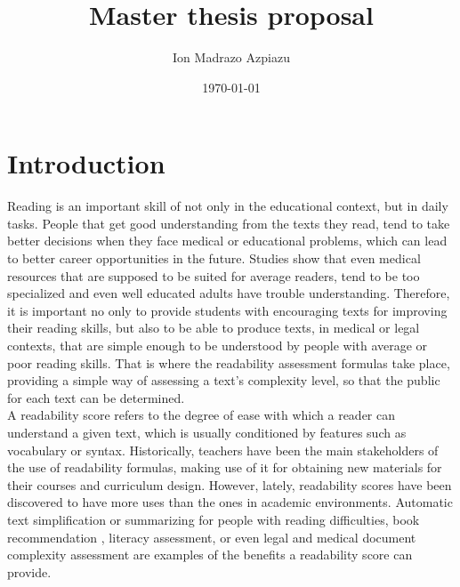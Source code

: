 \documentclass[12pt]{article}
\title{Master thesis proposal}
\author{Ion Madrazo Azpiazu}
\date{\today}
\begin{document}
\maketitle
\section{Introduction}

Reading is an important skill of not only in the educational context, but in daily tasks. People that get good understanding from the texts they read, tend to take better decisions when they face medical or educational problems, which can lead to better career opportunities in the future. Studies\cite{medicalReadability1}\cite{medicalReadability2}\cite{medicalReadability3} show that even medical resources that are supposed to be suited for average readers, tend to be too specialized and even well educated adults have trouble understanding. Therefore, it is important no only to provide students with encouraging texts for improving their reading skills, but also to be able to produce texts, in medical or legal contexts, that are simple enough to be understood by people with average or poor reading skills.  That is where the readability assessment formulas take place, providing a simple way of assessing a text's complexity level, so that the public for each text can be determined. \\


A readability score refers to the degree of ease with which a reader can understand a given text, which is usually conditioned by features such as vocabulary or syntax. Historically, teachers have been the main stakeholders of the use of readability formulas, making use of it for obtaining new materials for their courses and curriculum design. However, lately, readability scores have been discovered to have more uses than the ones in academic environments. Automatic text simplification\cite{textsimplification1}\cite{textsimplification2} or summarizing for people with reading difficulties\cite{textsimplificationWithDisabilities1}, book recommendation \cite{pera2014automating}, literacy assessment\cite{literacy1}, or even legal\cite{legalreadability} and medical document complexity assessment\cite{medicalReadability1}\cite{medicalReadability2}\cite{medicalReadability3} are examples of the benefits a readability score can provide.\\
\end{document}
